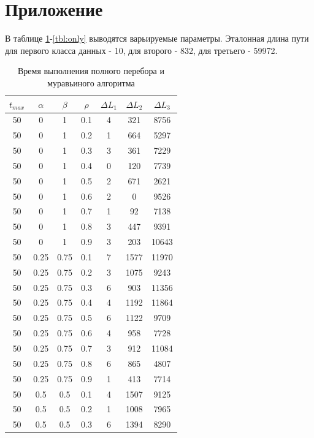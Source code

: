 \documentclass[a4paper,oneside,14pt]{extreport}
\begin{document}
\chapter*{Приложение}
В таблице \ref{tbl:only1}-\ref{tbl:only} выводятся варьируемые параметры. Эталонная длина пути для первого класса данных - 10, для второго - 832, для третьего - 59972.
\begin{table}[H]
\begin{center}
	\captionsetup{justification=raggedright, singlelinecheck=false}
	\caption[]{\label{tbl:only1} Время выполнения полного перебора и муравьиного алгоритма}
	\begin{tabular}{|c|c|c|c|c|c|c|}
		\hline
		$t_{max}$ & $\alpha$ & $\beta$ & $\rho$ & $\Delta L_{1}$ & $\Delta L_{2}$ & $\Delta L_{3}$ \\
		\hline
		50 & 0 & 1 & 0.1 & 4 & 321 & 8756 \\
		50 & 0 & 1 & 0.2 & 1 & 664 & 5297 \\
		50 & 0 & 1 & 0.3 & 3 & 361 & 7229 \\
		50 & 0 & 1 & 0.4 & 0 & 120 & 7739 \\
		50 & 0 & 1 & 0.5 & 2 & 671 & 2621 \\
		50 & 0 & 1 & 0.6 & 2 & 0 & 9526 \\
		50 & 0 & 1 & 0.7 & 1 & 92 & 7138 \\
		50 & 0 & 1 & 0.8 & 3 & 447 & 9391 \\
		50 & 0 & 1 & 0.9 & 3 & 203 & 10643 \\
		50 & 0.25 & 0.75 & 0.1 & 7 & 1577 & 11970 \\
		50 & 0.25 & 0.75 & 0.2 & 3 & 1075 & 9243 \\
		50 & 0.25 & 0.75 & 0.3 & 6 & 903 & 11356 \\
		50 & 0.25 & 0.75 & 0.4 & 4 & 1192 & 11864 \\
		50 & 0.25 & 0.75 & 0.5 & 6 & 1122 & 9709 \\
		50 & 0.25 & 0.75 & 0.6 & 4 & 958 & 7728 \\
		50 & 0.25 & 0.75 & 0.7 & 3 & 912 & 11084 \\
		50 & 0.25 & 0.75 & 0.8 & 6 & 865 & 4807 \\
		50 & 0.25 & 0.75 & 0.9 & 1 & 413 & 7714 \\
		50 & 0.5 & 0.5 & 0.1 & 4 & 1507 & 9125 \\
		50 & 0.5 & 0.5 & 0.2 & 1 & 1008 & 7965 \\
		50 & 0.5 & 0.5 & 0.3 & 6 & 1394 & 8290 \\

\end{tabular}
\end{center}
\end{table}
\end{document}
